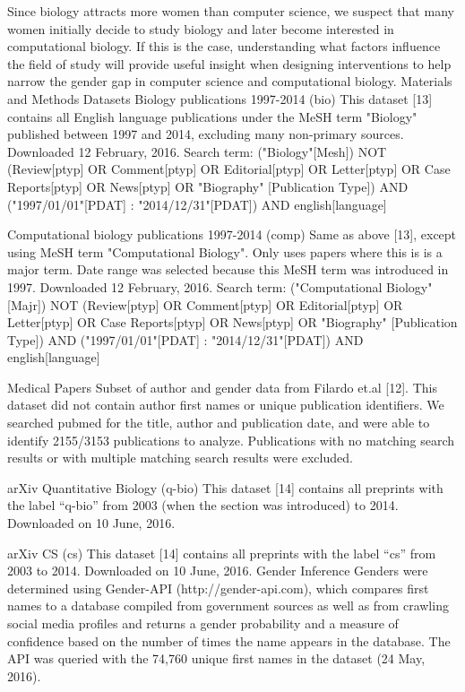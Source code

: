 \documentclass[11pt]{article}
\begin{document}
Since biology attracts more women than computer science, we suspect that many women initially decide to study biology and later become interested in computational biology. If this is the case, understanding what factors influence the field of study will provide useful insight when designing interventions to help narrow the gender gap in computer science and computational biology.
Materials and Methods
Datasets
Biology publications 1997-2014 (bio)
This dataset [13] contains all English language publications under the MeSH term "Biology" published between 1997 and 2014, excluding many non-primary sources. Downloaded 12 February, 2016. Search term: ("Biology"[Mesh]) NOT (Review[ptyp] OR Comment[ptyp] OR Editorial[ptyp] OR Letter[ptyp] OR Case Reports[ptyp] OR News[ptyp] OR "Biography" [Publication Type]) AND ("1997/01/01"[PDAT] : "2014/12/31"[PDAT]) AND english[language]

Computational biology publications 1997-2014 (comp)
Same as above [13], except using MeSH term "Computational Biology". Only uses papers where this is is a major term. Date range was selected because this MeSH term was introduced in 1997. Downloaded 12 February, 2016. Search term: ("Computational Biology"[Majr]) NOT (Review[ptyp] OR Comment[ptyp] OR Editorial[ptyp] OR Letter[ptyp] OR Case Reports[ptyp] OR News[ptyp] OR "Biography" [Publication Type]) AND ("1997/01/01"[PDAT] : "2014/12/31"[PDAT]) AND english[language]

Medical Papers
Subset of author and gender data from Filardo et.al [12]. This dataset did not contain author first names or unique publication identifiers. We searched pubmed for the title, author and publication date, and were able to identify 2155/3153 publications to analyze. Publications with no matching search results or with multiple matching search results were excluded.

arXiv Quantitative Biology (q-bio)
This dataset [14] contains all preprints with the label “q-bio” from 2003 (when the section was introduced) to 2014. Downloaded on 10 June, 2016.

arXiv CS (cs)
This dataset [14] contains all preprints with the label “cs” from 2003 to 2014. Downloaded on 10 June, 2016.
Gender Inference
Genders were determined using Gender-API (http://gender-api.com), which compares first names to a database compiled from government sources as well as from crawling social media profiles and returns a gender probability and a measure of confidence based on the number of times the name appears in the database. The API was queried with the 74,760 unique first names in the dataset (24 May, 2016).
\end{document}
